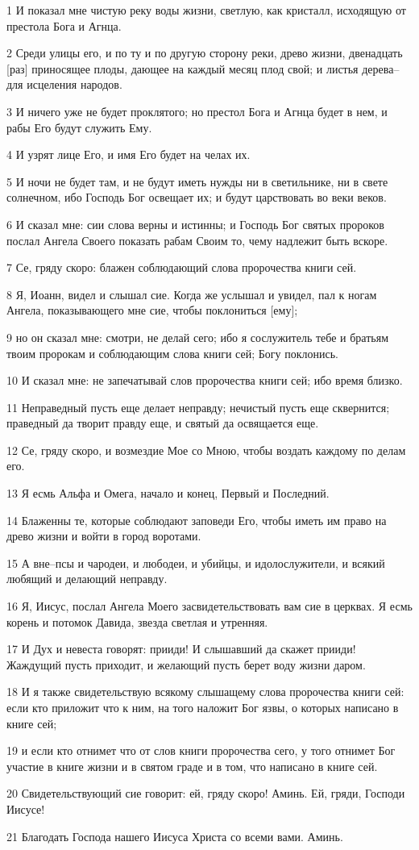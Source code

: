 \par 1 И показал мне чистую реку воды жизни, светлую, как кристалл, исходящую от престола Бога и Агнца.
\par 2 Среди улицы его, и по ту и по другую сторону реки, древо жизни, двенадцать [раз] приносящее плоды, дающее на каждый месяц плод свой; и листья дерева--для исцеления народов.
\par 3 И ничего уже не будет проклятого; но престол Бога и Агнца будет в нем, и рабы Его будут служить Ему.
\par 4 И узрят лице Его, и имя Его будет на челах их.
\par 5 И ночи не будет там, и не будут иметь нужды ни в светильнике, ни в свете солнечном, ибо Господь Бог освещает их; и будут царствовать во веки веков.
\par 6 И сказал мне: сии слова верны и истинны; и Господь Бог святых пророков послал Ангела Своего показать рабам Своим то, чему надлежит быть вскоре.
\par 7 Се, гряду скоро: блажен соблюдающий слова пророчества книги сей.
\par 8 Я, Иоанн, видел и слышал сие. Когда же услышал и увидел, пал к ногам Ангела, показывающего мне сие, чтобы поклониться [ему];
\par 9 но он сказал мне: смотри, не делай сего; ибо я сослужитель тебе и братьям твоим пророкам и соблюдающим слова книги сей; Богу поклонись.
\par 10 И сказал мне: не запечатывай слов пророчества книги сей; ибо время близко.
\par 11 Неправедный пусть еще делает неправду; нечистый пусть еще сквернится; праведный да творит правду еще, и святый да освящается еще.
\par 12 Се, гряду скоро, и возмездие Мое со Мною, чтобы воздать каждому по делам его.
\par 13 Я есмь Альфа и Омега, начало и конец, Первый и Последний.
\par 14 Блаженны те, которые соблюдают заповеди Его, чтобы иметь им право на древо жизни и войти в город воротами.
\par 15 А вне--псы и чародеи, и любодеи, и убийцы, и идолослужители, и всякий любящий и делающий неправду.
\par 16 Я, Иисус, послал Ангела Моего засвидетельствовать вам сие в церквах. Я есмь корень и потомок Давида, звезда светлая и утренняя.
\par 17 И Дух и невеста говорят: прииди! И слышавший да скажет прииди! Жаждущий пусть приходит, и желающий пусть берет воду жизни даром.
\par 18 И я также свидетельствую всякому слышащему слова пророчества книги сей: если кто приложит что к ним, на того наложит Бог язвы, о которых написано в книге сей;
\par 19 и если кто отнимет что от слов книги пророчества сего, у того отнимет Бог участие в книге жизни и в святом граде и в том, что написано в книге сей.
\par 20 Свидетельствующий сие говорит: ей, гряду скоро! Аминь. Ей, гряди, Господи Иисусе!
\par 21 Благодать Господа нашего Иисуса Христа со всеми вами. Аминь.


